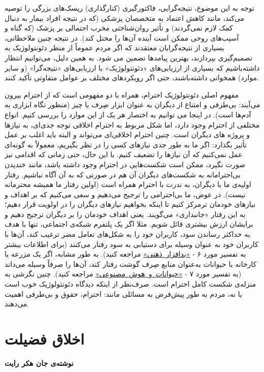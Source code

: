 توجه به این موضوع، نتیجه‌گرایی، فاکتورگیری (کنارگذاری) ریسک‌های بزرگی را توصیه می‌کند، مانند کاهش اعتماد به متخصصان پزشکی (که در نتیجه افراد بیمار به دنبال کمک لازم نمی‌گردند) و تأثیر روان‌شناختی مخرب احتمالی بر پزشک (که گناه و آسیب‌های روحی ممکن است آینده آن‌ها را مختل کند).
در نتیجه چنین ملاحظاتی، بسیاری از نتیجه‌گرایان معتقدند که اگر مردم عموماً از منظر دئونتولوژیک به تصمیم‌گیری بپردازند، بهترین پیامدها تضمین می شود.
به همین دلیل، می‌توانیم انتظار داشته‌باشیم که بسیاری از ارزیابی‌های «دئونتولوژیک» با ارزیابی‌های «نتیجه‌گرا» (و سایر موارد) همخوانی داشته‌باشند، حتی اگر رویکردهای مختلف بر عوامل متفاوتی تأکید کنند.

مفهوم اصلی دئونتولوژیک احترام، همراه با دو مفهومی است که از احترام بیرون می‌آیند: بی‌طرفی و امتناع از دیگران به عنوان ابزار صِرف یا چیز (منظور نگاه ابزاری به آدم‌ها است).
در اینجا می توانیم به اختصار هر یک از این موارد را بررسی کنیم.
انواع مختلفی از احترام وجود دارد، اما شکل مربوط به احترام اخلاقی توجه جدی‌ای، به نیازها و پروژه های دیگران است.
چنین احترام اخلاقی‌ای می‌تواند و البته باید اغلب بر عمل تأثیر بگذارد: اگر ما به طور جدی نیازهای کسی را در نظر بگیریم، معمولاً به گونه‌ای عمل نمی‌کنیم که آن نیازها را تضعیف کنیم.
با این حال، حتی زمانی که اقدامی نیز صورت نگیرد، ممکن است شکست‌هایی در احترام وجود داشته باشد، مانند خندیدن بی‌احترامانه به شکست‌های دیگران آن هم در صورتی که به آن آگاه نباشیم.
رفتار اولیه‌ی ما با دیگران، به ندرت با احترام همراه است (اولین رفتار ما همیشه محترمانه نیست).
در عوض، ما بی‌احترامی را ترجیح می‌دهیم و سعی می‌کنیم که بر اهداف و نیازهای خودمان ترمرکز کنیم تا اینکه بخواهیم نیازهای دیگران را در اولویت قرار دهیم؛ به این رفتار «جانبداری» می‌گویند.
یعنی اهداف خودمان را بر دیگران ترجیح دهیم و برایشان ارزش بیشتری قائل شویم.
مثلا اگر یک پلتفرم شبکه‌ی اجتماعی، تنها با هدف به حداکثر رساندن سود، کاربران خود را به شکل‌های تعامل مضر ترغیب کند، آن‌ها با کاربران خود به عنوان وسیله برای دستیابی به سود رفتار می‌کنند (برای اطلاعات بیشتر به تفسیر مورد ۶ - \hyperref[subsec:مورد۶ - بدافزار ذهنی: الگوریتم‌ها و معماری انتخاب]{\mbox{«بدافزار ذهنی»}} مراجعه کنید).
به طور مشابه، اگر یک مزرعه یا کارخانه با حیوانات به‌عنوان منابع صِرف گوشت رفتار کند، آن‌ها را صرفاً وسیله می‌داند (به تفسیر مورد ۷ - \hyperref[subsec:مورد۷ - هوش مصنوعی و موجودات غیر انسان]{\mbox{«حیوانات و هوش مصنوعی»}} مراجعه کنید).
چنین نگرشی به منزله‌ی شکست کامل احترام است.
صرف‌نظر از اینکه دیدگاه دئونتولوژیک خوب است یا نه، مردم به طور پیش‌فرض به مسائلی مانند: احترام، حقوق و بی‌طرفی اهمیت می‌دهند.


\section*{اخلاق فضیلت}
\label{sec:اخلاق فضیلت}
\textbf{نوشته‌ی جان هکر رایت}
